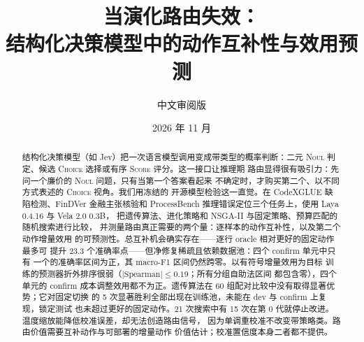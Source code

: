 \documentclass[11pt,a4paper,fontset=windows]{ctexart}
\title{当演化路由失效：\\ 结构化决策模型中的动作互补性与效用预测}
\author{中文审阅版}
\date{2026 年 11 月}
\newcommand{\noul}{\textsc{Noul}}
\newcommand{\choice}{\textsc{Choice}}
\newcommand{\score}{\textsc{Score}}
\begin{document}
\maketitle

\begin{abstract}
结构化决策模型（如 Jev）把一次语言模型调用变成带类型的概率判断：二元
\noul{} 判定、候选 \choice{} 选择或有序 \score{} 评分。这一接口让推理期
路由显得很有吸引力：先问一个廉价的 \noul{} 问题，只有当第一个答案看起来
不确定时，才购买第二个、以不同方式表述的 \choice{} 视角。我们用冻结的
开源模型检验这一直觉。在 CodeXGLUE 缺陷检测、FinDVer 金融主张核验和
ProcessBench 推理错误定位三个任务上，使用 Laya 0.4.16 与 Vela 2.0 0.3B，
把遗传算法、进化策略和 NSGA-II 与固定策略、预算匹配的随机搜索进行比较，
并测量路由真正需要的两个量：逐样本的动作互补性，以及第二个动作增量效用
的可预测性。总互补机会确实存在——逐行 oracle 相对更好的固定动作最多可
提升 23.3 个准确率点——但净修复稀疏且依赖数据池：四个 confirm 单元中只有
一个的准确率区间为正，其 macro-F1 区间仍然跨零。以有符号增量效用为目标
训练的预测器折外排序很弱（$|\text{Spearman}|\le 0.19$；所有分组自助法区间
都包含零），四个单元的 confirm 成本调整效用都不为正。遗传算法在 60 组配对比较中没有取得显著优势；它对固定切换
的 5 次显著胜利全部出现在训练池，未能在 dev 与 confirm 上复现，锁定测试
也未超过更好的固定动作。21 次搜索中有
15 次在第 0 代就停止改进。温度缩放能降低校准误差，却无法创造路由信号，
因为单调重校准不改变带策略类。路由价值需要互补动作与可部署的增量动作
价值估计；校准置信度本身二者都不提供。
\end{abstract}










\end{document}
